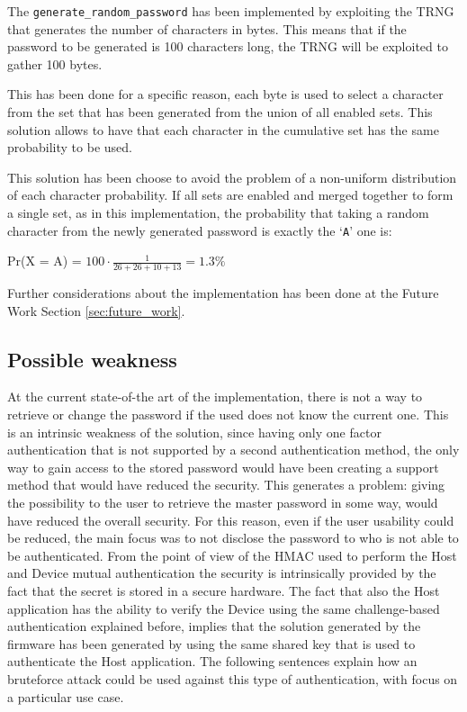 The \texttt{generate\_random\_password} has been implemented by exploiting the TRNG that generates the number of characters in bytes. This means that if the password to be generated is 100 characters long, the TRNG will be exploited to gather 100 bytes. 

This has been done for a specific reason, each byte is used to select a character from the set that has been generated from the union of all enabled sets.\newline\newline
This solution allows to have that each character in the cumulative set has the same probability to be used.

This solution has been choose to avoid the problem of a non-uniform distribution of each character probability. If all sets are enabled and merged together to form a single set, as in this implementation, the probability that taking a random character from the newly generated password is exactly the `\texttt{A}' one is:
\begin{center}
	Pr(X = A) = $100 \cdot \frac{1}{26+26+10+13} = 1.3 \%$
\end{center}

Further considerations about the implementation has been done at the Future Work Section \ref{sec:future_work}.

\subsection{Possible weakness}
\label{sec:weakness}
At the current state-of-the art of the implementation, there is not a way to retrieve or change the password if the used does not know the current one. This is an intrinsic weakness of the solution, since having only one factor authentication that is not supported by a second authentication method, the only way to gain access to the stored password would have been creating a support method that would have reduced the security. This generates a problem: giving the possibility to the user to retrieve the master password in some way, would have reduced the overall security. For this reason, even if the user usability could be reduced, the main focus was to not disclose the password to who is not able to be authenticated.\newline\newline
From the point of view of the HMAC used to perform the Host and Device mutual authentication the security is intrinsically provided by the fact that the secret is stored in a secure hardware. The fact that also the Host application has the ability to verify the Device using the same challenge-based authentication explained before, implies that the solution generated by the firmware has been generated by using the same shared key that is used to authenticate the Host application. The following sentences explain how an bruteforce attack could be used against this type of authentication, with focus on a particular use case.

